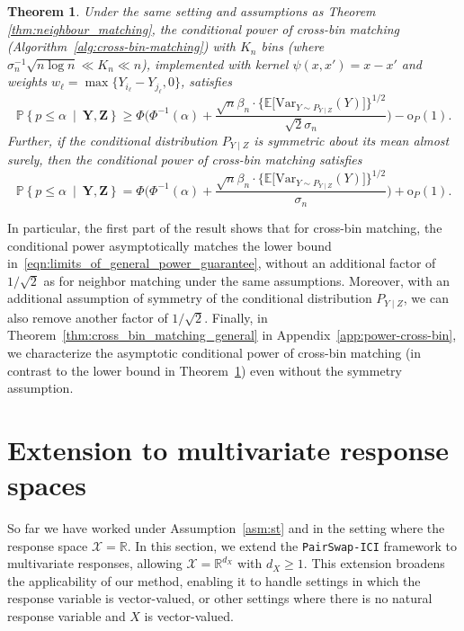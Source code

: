 \documentclass[12pt]{article}
\newtheorem{theorem}{Theorem}%
\newcommand{\R}{\mathbb{R}}
\newcommand{\PPst}[2]{\mathbb{P}\left\{{#1}\  \middle| \ {#2}\right\}}
\newcommand{\Xcal}{\mathcal{X}}
\newcommand{\bY}{\mathbf{Y}}
\newcommand{\bZ}{\mathbf{Z}}
\begin{document}
\begin{theorem}\label{thm:cross_bin_matching}
    Under the same setting and assumptions as Theorem \ref{thm:neighbour_matching}, the conditional power of cross-bin matching (Algorithm~\ref{alg:cross-bin-matching}) with $K_n$ bins (where $\sigma_n^{-1}\sqrt{n \log n}\ll K_n \ll n$), implemented with kernel $\psi(x,x')=x-x'$ and weights $w_\ell=\max\bigl\{Y_{i_\ell}-Y_{j_\ell},0\bigr\}$, satisfies 
    \begin{equation}
    \label{Eq:CPLowerBound}
   \PPst{p\leq\alpha}{\bY,\bZ}\geq\Phi\biggl(\Phi^{-1}(\alpha)+\frac{\sqrt{n}\beta_n\cdot  \bigl\{\mathbb{E}\bigl[\mathrm{Var}_{Y\sim P_{Y\mid Z}}(Y)\bigr]\bigr\}^{1/2}}{\sqrt{2}\sigma_n}\biggr)-\mathrm{o}_P(1).
    \end{equation}
    Further, if the conditional distribution 
    $P_{Y\mid Z}$ is symmetric about its mean almost surely, then the conditional power of cross-bin matching satisfies 
    \[
  \PPst{p\leq\alpha}{\bY,\bZ}=\Phi\biggl(\Phi^{-1}(\alpha)+\frac{\sqrt{n}\beta_n\cdot  \bigl\{\mathbb{E}\bigl[\mathrm{Var}_{Y\sim P_{Y\mid Z}}(Y)\bigr]\bigr\}^{1/2}}{\sigma_n}\biggr)+\mathrm{o}_P(1).
    \]
\end{theorem}
In particular, the first part of the result shows that for cross-bin matching, the conditional power asymptotically matches the lower bound in~\eqref{eqn:limits_of_general_power_guarantee}, without an additional factor of $1/\sqrt{2}$ as for neighbor matching under the same assumptions. Moreover, with an additional assumption of symmetry of the conditional distribution $P_{Y\mid Z}$, we can also remove another factor of $1/\sqrt{2}$.  Finally, in Theorem~\ref{thm:cross_bin_matching_general} in Appendix~\ref{app:power-cross-bin}, we characterize the asymptotic conditional power of cross-bin matching (in contrast to the lower bound in Theorem~\ref{thm:cross_bin_matching}) even without the symmetry assumption.



\section{Extension to multivariate response spaces}\label{sec:extension}

So far we have worked under Assumption~\ref{asm:st} and in the setting where the response space $\Xcal=\R$. In this section, we extend the \texttt{PairSwap-ICI} framework to multivariate responses, allowing $\Xcal = \R^{d_X}$ with $d_X \ge 1$. This extension broadens the applicability of our method, enabling it to handle settings in which the response variable is vector-valued, or other settings where there is no natural response variable and $X$ is vector-valued.
\end{document}
